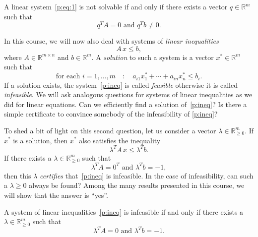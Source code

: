 \begin{theorem}
  \label{thr:8}
  A linear system~\eqref{p:eq:1} is not solvable if and only if there exists a vector $q ∈ ℝ^m$ such that 
  \begin{displaymath}
    q^T A = 0 \text{ and } q^T b \neq 0. 
  \end{displaymath}
\end{theorem}

In this course, we will now also deal with systems of \emph{linear inequalities} 
\begin{equation}
  \label{p:ineq}
  A \,x ≤ b,
\end{equation}
where $A ∈ ℝ^{m × n}$ and $b ∈ ℝ^m$. A \emph{solution} to such a system is a vector $x^* ∈ ℝ^m$ such that
\begin{equation}
  \label{p:sol}
 \text{for each } i=1,\dots,m \quad : \quad   a_{i1} x^*_1 + \cdots + a_{in} x^*_n \leq b_i.  
\end{equation}
If a solution exists, the system~\eqref{p:ineq} is called \emph{feasible} otherwise it is called \emph{infeasible}. 
We will ask analogous questions for  systems of linear inequalities as we did for linear equations. Can we efficiently find a solution of~\eqref{p:ineq}?  Is there a simple certificate to convince somebody of the infeasibility of \eqref{p:ineq}? 

To shed a bit of light on this second question, let us consider a vector $λ ∈ ℝ^m_{≥0}$. If $x^*$ is a solution, then $x^*$ also satisfies the inequality 
\begin{equation}
  \label{p:impli}
  λ^T A \, x ≤ λ^T b.
\end{equation}
If there exists a $λ \in ℝ^m_{≥0}$ such that 
\begin{equation}
  \label{p:Farkas}
  λ^T A = 0^T \text{ and } λ^T b = -1,
\end{equation}
then this $λ$ \emph{certifies} that~\eqref{p:ineq} is infeasible. In the case of infeasibility, can such a $λ≥0$ always be found? Among the many results presented in  this course,  we will show that the answer is ``yes''. 
\begin{theorem}
  \label{thr:7}
  A system of linear inequalities~\eqref{p:ineq} is infeasible if and only if there exists a $λ ∈ ℝ^m_{≥0}$ such that 
  \begin{displaymath}
    λ^T A = 0 \text{ and } λ^T b = -1.
  \end{displaymath}
\end{theorem}


